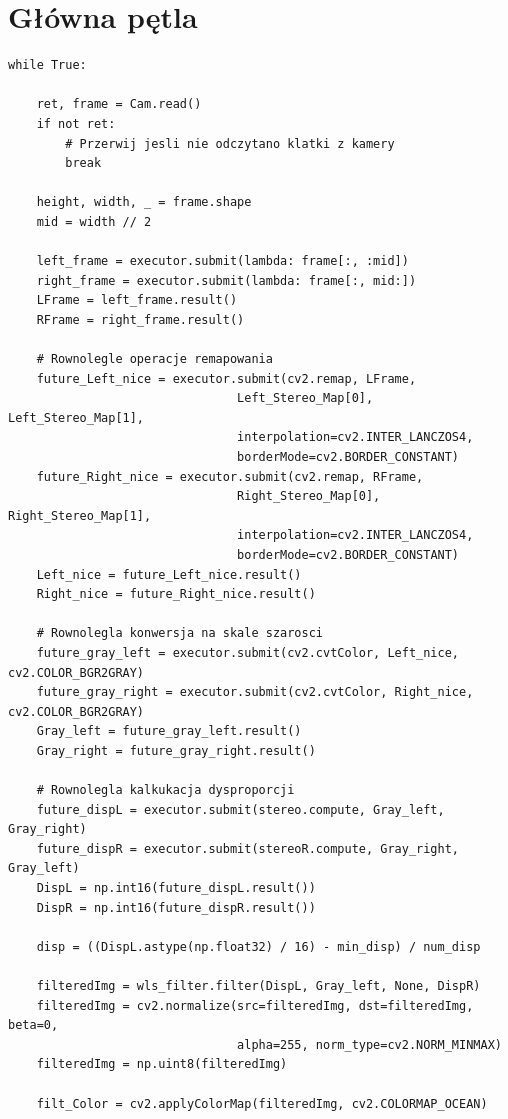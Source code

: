 \documentclass[magisterska]{pracadypl}
\begin{document}
\section{Główna pętla}

\begin{lstlisting}[style=mypython]
while True:

    ret, frame = Cam.read()
    if not ret:
        # Przerwij jesli nie odczytano klatki z kamery
        break

    height, width, _ = frame.shape
    mid = width // 2

    left_frame = executor.submit(lambda: frame[:, :mid])
    right_frame = executor.submit(lambda: frame[:, mid:])
    LFrame = left_frame.result()
    RFrame = right_frame.result()

    # Rownolegle operacje remapowania 
    future_Left_nice = executor.submit(cv2.remap, LFrame,
                                Left_Stereo_Map[0], Left_Stereo_Map[1],
                                interpolation=cv2.INTER_LANCZOS4,
                                borderMode=cv2.BORDER_CONSTANT)
    future_Right_nice = executor.submit(cv2.remap, RFrame,
                                Right_Stereo_Map[0], Right_Stereo_Map[1],
                                interpolation=cv2.INTER_LANCZOS4,
                                borderMode=cv2.BORDER_CONSTANT)
    Left_nice = future_Left_nice.result()
    Right_nice = future_Right_nice.result()

    # Rownolegla konwersja na skale szarosci
    future_gray_left = executor.submit(cv2.cvtColor, Left_nice, cv2.COLOR_BGR2GRAY)
    future_gray_right = executor.submit(cv2.cvtColor, Right_nice, cv2.COLOR_BGR2GRAY)
    Gray_left = future_gray_left.result()
    Gray_right = future_gray_right.result()

    # Rownolegla kalkukacja dysproporcji
    future_dispL = executor.submit(stereo.compute, Gray_left, Gray_right)
    future_dispR = executor.submit(stereoR.compute, Gray_right, Gray_left)
    DispL = np.int16(future_dispL.result())
    DispR = np.int16(future_dispR.result())

    disp = ((DispL.astype(np.float32) / 16) - min_disp) / num_disp

    filteredImg = wls_filter.filter(DispL, Gray_left, None, DispR)
    filteredImg = cv2.normalize(src=filteredImg, dst=filteredImg, beta=0, 
                                alpha=255, norm_type=cv2.NORM_MINMAX)
    filteredImg = np.uint8(filteredImg)

    filt_Color = cv2.applyColorMap(filteredImg, cv2.COLORMAP_OCEAN)
\end{lstlisting}
\end{document}
